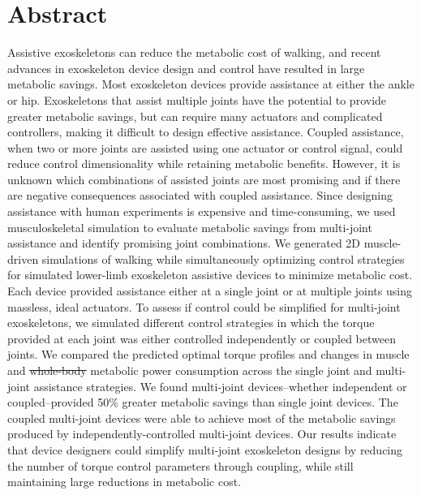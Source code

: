 \documentclass[10pt,letterpaper]{article}
\providecommand{\DIFaddtex}[1]{{\protect\color{blue}{#1}}} %
\providecommand{\DIFdeltex}[1]{{\protect\color{red}\sout{#1}}}                      %
\providecommand{\DIFaddbegin}{} %
\providecommand{\DIFaddend}{} %
\providecommand{\DIFdelbegin}{} %
\providecommand{\DIFdelend}{} %
\providecommand{\DIFadd}[1]{\texorpdfstring{\DIFaddtex{#1}}{#1}} %
\providecommand{\DIFdel}[1]{\texorpdfstring{\DIFdeltex{#1}}{}} %
\newcommand{\DIFscaledelfig}{0.5}
\newlength{\DIFdelgraphicswidth} %
\newlength{\DIFdelgraphicsheight} %
\newcommand{\DIFaddincludegraphics}[2][]{{\color{blue}\fbox{\DIFOincludegraphics[#1]{#2}}}} %
\newcommand{\DIFdelincludegraphics}[2][]{%
\sbox{\DIFdelgraphicsbox}{\DIFOincludegraphics[#1]{#2}}%
\settoboxwidth{\DIFdelgraphicswidth}{\DIFdelgraphicsbox} %
\settoboxtotalheight{\DIFdelgraphicsheight}{\DIFdelgraphicsbox} %
\scalebox{\DIFscaledelfig}{%
\parbox[b]{\DIFdelgraphicswidth}{\usebox{\DIFdelgraphicsbox}\\[-\baselineskip] \rule{\DIFdelgraphicswidth}{0em}}\llap{\resizebox{\DIFdelgraphicswidth}{\DIFdelgraphicsheight}{%
\setlength{\unitlength}{\DIFdelgraphicswidth}%
\begin{picture}(1,1)%
\thicklines\linethickness{2pt} %
{\color[rgb]{1,0,0}\put(0,0){\framebox(1,1){}}}%
{\color[rgb]{1,0,0}\put(0,0){\line( 1,1){1}}}%
{\color[rgb]{1,0,0}\put(0,1){\line(1,-1){1}}}%
\end{picture}%
}*{3pt}}} %
} %
\DeclareRobustCommand{\DIFaddbegin}{\DIFOaddbegin \let\includegraphics\DIFaddincludegraphics} %
\DeclareRobustCommand{\DIFaddend}{\DIFOaddend \let\includegraphics\DIFOincludegraphics} %
\DeclareRobustCommand{\DIFdelbegin}{\DIFOdelbegin \let\includegraphics\DIFdelincludegraphics} %
\DeclareRobustCommand{\DIFdelend}{\DIFOaddend \let\includegraphics\DIFOincludegraphics} %
\begin{document}
\section*{Abstract}
Assistive exoskeletons can reduce the metabolic cost of walking, and recent advances in exoskeleton device design and control have resulted in large metabolic savings. Most exoskeleton devices provide assistance at either the ankle or hip. Exoskeletons that assist multiple joints have the potential to provide greater metabolic savings, but can require many actuators and complicated controllers, making it difficult to design effective assistance. Coupled assistance, when two or more joints are assisted using one actuator or control signal, could reduce control dimensionality while retaining metabolic benefits. However, it is unknown which combinations of assisted joints are most promising and if there are negative consequences associated with coupled assistance. Since designing assistance with human experiments is expensive and time-consuming, we used musculoskeletal simulation to evaluate metabolic savings from multi-joint assistance and identify promising joint combinations. We generated 2D muscle-driven simulations of walking while simultaneously optimizing control strategies for simulated lower-limb exoskeleton assistive devices to minimize metabolic cost. Each device provided assistance either at a single joint or at multiple joints using massless, ideal actuators. To assess if control could be simplified for multi-joint exoskeletons, we simulated different control strategies in which the torque provided at each joint was either controlled independently or coupled between joints. We compared the predicted optimal torque profiles and changes in muscle and \DIFdelbegin \DIFdel{whole-body }\DIFdelend \DIFaddbegin \DIFadd{total }\DIFaddend metabolic power consumption across the single joint and multi-joint assistance strategies. We found multi-joint devices--whether independent or coupled--provided 50\% greater metabolic savings than single joint devices. The coupled multi-joint devices were able to achieve most of the metabolic savings produced by independently-controlled multi-joint devices. Our results indicate that device designers could simplify multi-joint exoskeleton designs by reducing the number of torque control parameters through coupling, while still maintaining large reductions in metabolic cost. 

\linenumbers
\end{document}
